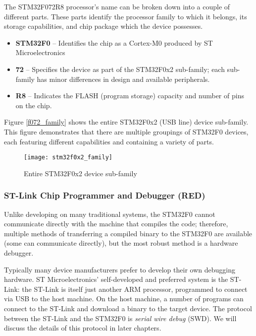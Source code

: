 \documentclass[11pt,fleqn]{book} %
\begin{document}
The STM32F072R8 processor's name can be broken down into a couple of different parts. These parts identify the processor family to which it belongs, its storage capabilities, and chip package which the device possesses.

\begin{itemize}
    \item \textbf{STM32F0} -- Identifies the chip as a Cortex-M0 produced by ST Microelectronics
    \item \textbf{72} -- Specifies the device as part of the STM32F0x2 sub-family; each sub-family has minor differences in design and available peripherals.
    \item \textbf{R8} -- Indicates the FLASH (program storage) capacity and number of pins on the chip.  
\end{itemize} 
Figure \vref{f072_family} shows the entire STM32F0x2 (USB line) device sub-family. This figure demonstrates that there are multiple groupings of STM32F0 devices, each featuring different capabilities and containing a variety of parts.

\begin{figure}[]
	\centering\texttt{[image: stm32f0x2\_family]}
	\caption{Entire STM32F0x2 device sub-family}
	\label{f072_family}
\end{figure}

\subsubsection*{ST-Link Chip Programmer and Debugger ({\color{red!90!black}RED})}
Unlike developing on many traditional systems, the STM32F0 cannot communicate directly with the machine that compiles the code; therefore, multiple methods of transferring a compiled binary to the STM32F0 are available (some can communicate directly), but the most robust method is a hardware debugger.

Typically many device manufacturers prefer to develop their own debugging hardware. ST Microelectronics' self-developed and preferred system is the ST-Link: the ST-Link is itself just another ARM processor, programmed to connect via USB to the host machine. On the host machine, a number of programs can connect to the ST-Link and download a binary to the target device. The protocol between the ST-Link and the STM32F0 is \textit{serial wire debug} (SWD).  We will discuss the details of this protocol in later chapters.
\end{document}
